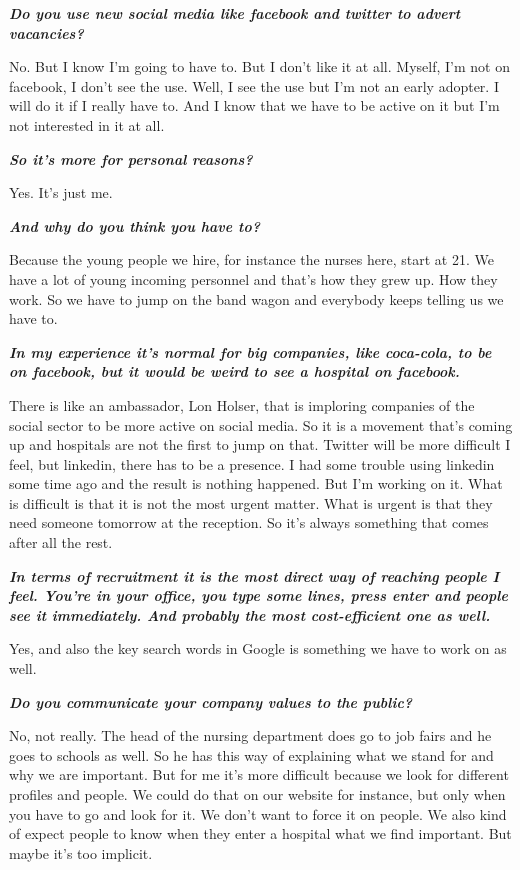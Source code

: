 \documentclass[a4paper,fleqn,11pt,dvips,titlepage]{article}
\newcommand{\question}[1]{\textbf{\textit{#1}}}
\numberwithin{figure}{section}
\numberwithin{equation}{section}
\begin{document}
\question{Do you use new social media like facebook and twitter to advert vacancies? }

No. But I know I’m going to have to. But I don’t like it at all. Myself, I’m not on facebook, I don’t see the use. Well, I see the use but I’m not an early adopter. I will do it if I really have to. And I know that we have to be active on it but I’m not interested in it at all. 

\question{So it’s more for personal reasons? }

Yes. It’s just me. 

\question{And why do you think you have to? }

Because the young people we hire, for instance the nurses here, start at 21. We have a lot of young incoming personnel and that’s how they grew up. How they work.  So we have to jump on the band wagon and everybody keeps telling us we have to. 

\question{In my experience it’s normal for big companies, like coca-cola, to be on facebook, but it would be weird to see a hospital on facebook. }

There is like an ambassador, Lon Holser, that is imploring companies of the social sector to be more active on social media. So it is a movement that’s coming up and hospitals are not the first to jump on that. Twitter will be more difficult I feel, but linkedin, there has to be a presence. I had some trouble using linkedin some time ago and the result is nothing happened. But I’m working on it. What is difficult is that it is not the most urgent matter. What is urgent is that they need someone tomorrow at the reception. So it’s always something that comes after all the rest. 

\question{In terms of recruitment it is the most direct way of reaching people I feel. You’re in your office, you type some lines, press enter and people see it immediately. And probably the most cost-efficient one as well. }

Yes, and also the key search words in Google is something we have to work on as well. 

\question{Do you communicate your company values to the public? }

No, not really. The head of the nursing department does go to job fairs and he goes to schools as well. So he has this way of explaining what we stand for and why we are important. But for me it’s more difficult because we look for different profiles and people. We could do that on our website for instance, but only when you have to go and look for it. We don’t want to force it on people. We also kind of expect people to know when they enter a hospital what we find important. But maybe it’s too implicit. 
\end{document}
